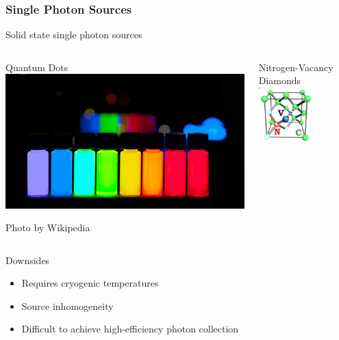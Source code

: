 \documentclass{beamer}
\begin{document}
\begin{frame}\frametitle{Single Photon Sources}
    Solid state single photon sources
    \begin{columns}
            \begin{block}{Quantum Dots}
                \centering
                \includegraphics[width=1.0\textwidth]{Images/QuantDots.jpg}

                \tiny{Photo by Wikipedia}
            \end{block}
            \begin{block}{Nitrogen-Vacancy Diamonds}
                \centering
                \includegraphics[width=0.6\textwidth]{Images/NVDiamond.jpg}
            \end{block}
    \end{columns}
    \begin{block}{Downsides}
        \begin{itemize}
            \item Requires cryogenic temperatures
            \item Source inhomogeneity
            \item Difficult to achieve high-efficiency photon collection
        \end{itemize}
    \end{block}
\end{frame}
\end{document}
